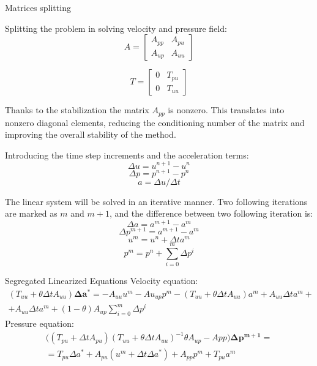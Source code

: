 \begin{frame}{Matrices splitting}

  Splitting the problem in solving velocity and pressure field:
\begin{equation}
  A = \begin{bmatrix}
A_{pp} & A_{pu}\\
A_{up} & A_{uu}
\end{bmatrix}
\end{equation}

\begin{equation}
  T = \begin{bmatrix}
  0 & T_{pu}\\
  0 & T_{uu}
\end{bmatrix}
\end{equation}


Thanks to the stabilization the matrix $A_{pp}$ is nonzero. This translates into nonzero diagonal elements, reducing the conditioning number of the matrix and improving the overall stability of the method.

\end{frame}


\begin{frame}
Introducing the time step increments and the acceleration terms:
$$\Delta u = u^{n+1}-u^{n}$$
$$\Delta p = p^{n+1}-p^{n}$$
$$a = \Delta u / \Delta t$$

The linear system will be solved in an iterative manner. Two following iterations are marked as $m$ and $m+1$, and the difference between two following iteration is:
$$\Delta a = a^{m+1}-a^m$$
$$\Delta p^{m+1} = a^{m+1}-a^m$$
$$u^m=u^n+\Delta t a^m$$
$$p^m = p^n + \sum_{i=0}^m \Delta p^i$$
\end{frame}

\begin{frame}{Segregated Linearized Equations}
  Velocity equation:
  \begin{equation}
    \begin{split}
    (T_{uu}+\theta \Delta t A_{uu})\bm{\Delta a^*} = -A_{uu}u^m- Au_{up}p^m - (T_{uu}+\theta\Delta t A_{uu})a^m+A_{uu}\Delta t a^m +\\+ A_{uu}\Delta t a^m + (1-\theta)A_{up}\sum_{i=0}^m \Delta p^i  
  \end{split}
  \label{equseg:mom1}
\end{equation}
Pressure equation:
\begin{equation}
 \begin{split}
  \bigg( (T_{pu}+\Delta t A_{pu})(T_{uu}+\theta\Delta t A_{uu})^{-1} \theta A_{up} - App \bigg ) \bm{\Delta p^{m+1}} = \\= T_{pu}\Delta a^* + A_{pu}(u^m+\Delta t\Delta a^*)+A_{pp}p^m+T_{pu}a^m
\end{split}
\label{equseg:cont1}
\end{equation}
\end{frame}

